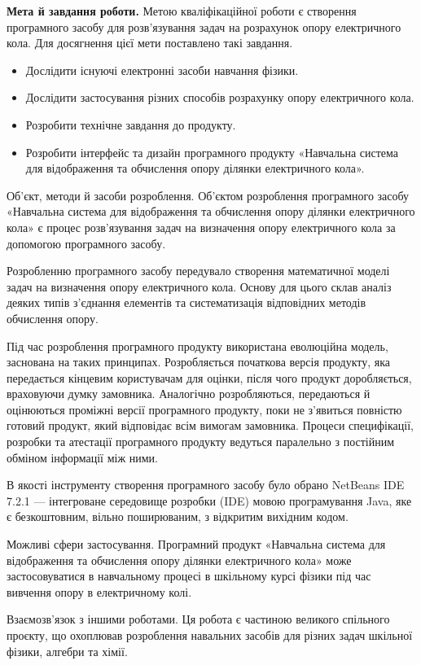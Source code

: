 {\textbf{Мета й завдання роботи.} Метою кваліфікаційної роботи є створення
програмного засобу для розв’язування задач на розрахунок опору електричного
кола. Для досягнення цієї мети поставлено такі завдання.
\begin{itemize}
    \item Дослідити існуючі електронні засоби навчання фізики.
    \item Дослідити застосування різних способів розрахунку опору
    електричного кола.
    \item Розробити технічне завдання до продукту.
    \item Розробити інтерфейс та дизайн програмного продукту «Навчальна
    система для відображення та обчислення опору ділянки електричного
    кола».
\end{itemize}

Об'єкт, методи й засоби розроблення. Об’єктом розроблення програмного
засобу «Навчальна система для відображення та обчислення опору ділянки
електричного кола» є процес розв’язування задач на визначення опору
електричного кола за допомогою програмного засобу.

Розробленню програмного засобу передувало створення математичної
моделі задач на визначення опору електричного кола. Основу для цього склав
аналіз деяких типів з’єднання елементів та систематизація відповідних методів
обчислення опору.

Під час розроблення програмного продукту використана еволюційна
модель, заснована на таких принципах. Розробляється початкова версія продукту,
яка передається кінцевим користувачам для оцінки, після чого продукт
доробляється, враховуючи думку замовника. Аналогічно розробляються,
передаються й оцінюються проміжні версії програмного продукту, поки не
з’явиться повністю готовий продукт, який відповідає всім вимогам замовника.
Процеси специфікації, розробки та атестації програмного продукту ведуться
паралельно з постійним обміном інформації між ними.

В якості інструменту створення програмного засобу було обрано NetBeans
IDE 7.2.1 --- інтегроване середовище розробки (IDE) мовою програмування Java,
яке є безкоштовним, вільно поширюваним, з відкритим вихідним кодом.

Можливі сфери застосування. Програмний продукт «Навчальна система
для відображення та обчислення опору ділянки електричного кола» може
застосовуватися в навчальному процесі в шкільному курсі фізики під час
вивчення опору в електричному колі.

Взаємозв’язок з іншими роботами. Ця робота є частиною великого
спільного проєкту, що охоплював розроблення навальних засобів для різних
задач шкільної фізики, алгебри та хімії.

}
